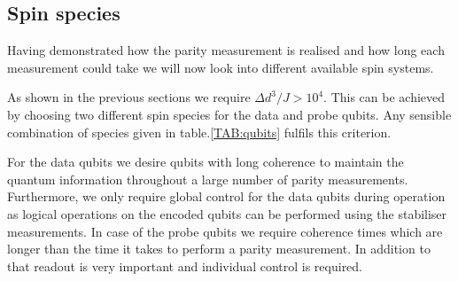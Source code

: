 
\subsection{Spin species}

Having demonstrated how the parity measurement is realised and how long each measurement could take we will now look into different available spin systems. 

As shown in the previous sections we require $\Delta d^3/ J > 10^4$. This can be achieved by choosing two different spin species for the data and probe qubits. Any sensible combination of species given in table.\@ \ref*{TAB:qubits} fulfils this criterion.

For the data qubits we desire qubits with long coherence to maintain the quantum information throughout a large number of parity measurements. Furthermore, we only require global control for the data qubits during operation as logical operations on the encoded qubits can be performed using the stabiliser measurements.
In case of the probe qubits we require coherence times which are longer than the time it takes to perform a parity measurement. In addition to that readout is very important and individual control is required.

